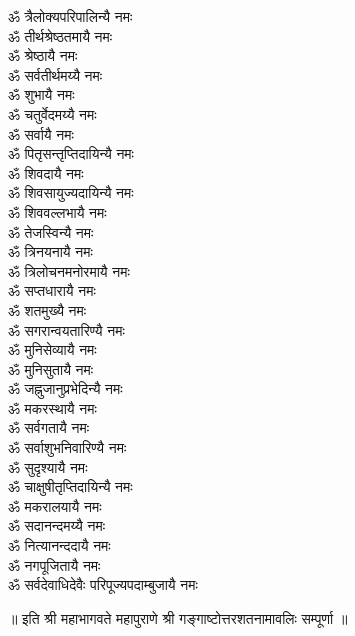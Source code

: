 \begin{multicols}{2}
\begin{flushleft}
ॐ त्रैलोक्यपरिपालिन्यै नमः\\
ॐ तीर्थश्रेष्ठतमायै नमः\hfill{}\\
ॐ श्रेष्ठायै नमः\\
ॐ सर्वतीर्थमय्यै नमः\\
ॐ शुभायै नमः\\
ॐ चतुर्वेदमय्यै नमः\\
ॐ सर्वायै नमः\\
ॐ पितृसन्तृप्तिदायिन्यै नमः\\
ॐ शिवदायै नमः\\
ॐ शिवसायुज्यदायिन्यै नमः\\
ॐ शिववल्लभायै नमः\\
ॐ तेजस्विन्यै नमः\hfill{}\\
ॐ त्रिनयनायै नमः\\
ॐ त्रिलोचनमनोरमायै नमः\\
ॐ सप्तधारायै नमः\\
ॐ शतमुख्यै नमः\\
ॐ सगरान्वयतारिण्यै नमः\\
ॐ मुनिसेव्यायै नमः\\
ॐ मुनिसुतायै नमः\\
ॐ जह्नुजानुप्रभेदिन्यै नमः\\
ॐ मकरस्थायै नमः\\
ॐ सर्वगतायै नमः\hfill{}\\
ॐ सर्वाशुभनिवारिण्यै नमः\\
ॐ सुदृश्यायै नमः\\
ॐ चाक्षुषीतृप्तिदायिन्यै नमः\\
ॐ मकरालयायै नमः\\
ॐ सदानन्दमय्यै नमः\\
ॐ नित्यानन्ददायै नमः\\
ॐ नगपूजितायै नमः\\
ॐ सर्वदेवाधिदेवैः परिपूज्यपदाम्बुजायै नमः\\
\end{flushleft}
\end{multicols}
\centerline{॥ इति श्री महाभागवते महापुराणे श्री गङ्गाष्टोत्तरशतनामावलिः सम्पूर्णा ॥}
